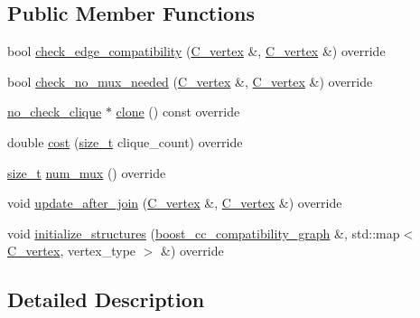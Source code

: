 \subsection*{Public Member Functions}
\begin{DoxyCompactItemize}
\item 
bool \hyperlink{structno__check__clique_a8b4c77a0a9cf081c5698aed9a190a5fb}{check\+\_\+edge\+\_\+compatibility} (\hyperlink{clique__covering__graph_8hpp_a9cb45047ea8c5ed95a8cfa90494345aa}{C\+\_\+vertex} \&, \hyperlink{clique__covering__graph_8hpp_a9cb45047ea8c5ed95a8cfa90494345aa}{C\+\_\+vertex} \&) override
\item 
bool \hyperlink{structno__check__clique_a1eea58910487023f2e2c323ec73490d7}{check\+\_\+no\+\_\+mux\+\_\+needed} (\hyperlink{clique__covering__graph_8hpp_a9cb45047ea8c5ed95a8cfa90494345aa}{C\+\_\+vertex} \&, \hyperlink{clique__covering__graph_8hpp_a9cb45047ea8c5ed95a8cfa90494345aa}{C\+\_\+vertex} \&) override
\item 
\hyperlink{structno__check__clique}{no\+\_\+check\+\_\+clique} $\ast$ \hyperlink{structno__check__clique_aa177c43e3c4736962a041c45441e0ec0}{clone} () const override
\item 
double \hyperlink{structno__check__clique_a9ab6b6c35b470916b74d86e15b2e024c}{cost} (\hyperlink{tutorial__fpt__2017_2intro_2sixth_2test_8c_a7c94ea6f8948649f8d181ae55911eeaf}{size\+\_\+t} clique\+\_\+count) override
\item 
\hyperlink{tutorial__fpt__2017_2intro_2sixth_2test_8c_a7c94ea6f8948649f8d181ae55911eeaf}{size\+\_\+t} \hyperlink{structno__check__clique_a1cd60108ede385b43774d331e407a4dc}{num\+\_\+mux} () override
\item 
void \hyperlink{structno__check__clique_a471b7884a66663db6a478c3a80b47b48}{update\+\_\+after\+\_\+join} (\hyperlink{clique__covering__graph_8hpp_a9cb45047ea8c5ed95a8cfa90494345aa}{C\+\_\+vertex} \&, \hyperlink{clique__covering__graph_8hpp_a9cb45047ea8c5ed95a8cfa90494345aa}{C\+\_\+vertex} \&) override
\item 
void \hyperlink{structno__check__clique_ada91909ec207beafc1907b4236ede31c}{initialize\+\_\+structures} (\hyperlink{clique__covering__graph_8hpp_af47b1c28cf9a2c360afafb8d80582ce6}{boost\+\_\+cc\+\_\+compatibility\+\_\+graph} \&, std\+::map$<$ \hyperlink{clique__covering__graph_8hpp_a9cb45047ea8c5ed95a8cfa90494345aa}{C\+\_\+vertex}, vertex\+\_\+type $>$ \&) override
\end{DoxyCompactItemize}


\subsection{Detailed Description}
